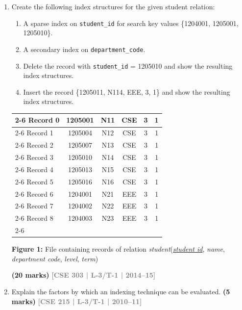 \documentclass[12pt,a3paper]{article}
\newcommand{\yr}[1]{\hfill\textcolor{gray}{\small\textbf{[#1]}}}
\newcommand{\mk}[1]{\textcolor{orange!70!black}{\small\textbf{(#1 marks)}}}
\begin{document}
\begin{enumerate}
\item Create the following index structures for the given student relation:
\begin{enumerate}
  \item A sparse index on \texttt{student\_id} for search key values \{1204001, 1205001, 1205010\}.
  \item A secondary index on \texttt{department\_code}.
  \item Delete the record with \texttt{student\_id} = 1205010 and show the resulting index structures.
  \item Insert the record \{1205011, N114, EEE, 3, 1\} and show the resulting index structures.
\end{enumerate}

\begin{center}
  
  \renewcommand{\arraystretch}{1.3} %
    \begin{tabular}{l |c|c|c|c|c|}
        \cline{2-6}
        Record 0 & 1205001 & N11 & CSE & 3 & 1 \\
        \cline{2-6}
        Record 1 & 1205004 & N12 & CSE & 3 & 1 \\
        \cline{2-6}
        Record 2 & 1205007 & N13 & CSE & 3 & 1 \\
        \cline{2-6}
        Record 3 & 1205010 & N14 & CSE & 3 & 1 \\
        \cline{2-6}
        Record 4 & 1205013 & N15 & CSE & 3 & 1 \\
        \cline{2-6}
        Record 5 & 1205016 & N16 & CSE & 3 & 1 \\
        \cline{2-6}
        Record 6 & 1204001 & N21 & EEE & 3 & 1 \\
        \cline{2-6}
        Record 7 & 1204002 & N22 & EEE & 3 & 1 \\
        \cline{2-6}
        Record 8 & 1204003 & N23 & EEE & 3 & 1 \\
        \cline{2-6}
    \end{tabular}
    
    \vspace{0.4cm}
    \textbf{Figure 1:} File containing records of relation \textit{student}(\underline{\textit{student id}}, \textit{name}, \textit{department code}, \textit{level}, \textit{term})

\end{center}

\mk{20} \yr{CSE 303 | L-3/T-1 | 2014--15}

\item Explain the factors by which an indexing technique can be evaluated.
\mk{5} \yr{CSE 215 | L-3/T-1 | 2010--11}

\end{enumerate}
\end{document}

